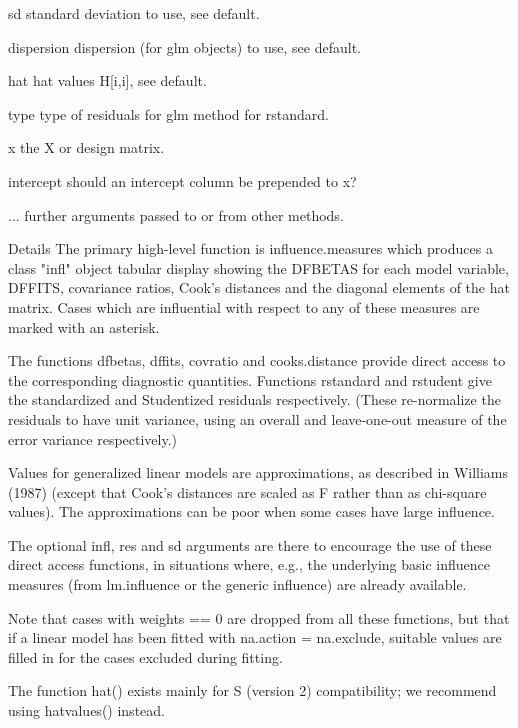 sd standard deviation to use, see default.
 
dispersion dispersion (for glm objects) to use, see default.
 
hat hat values H[i,i], see default.
 
type type of residuals for glm method for rstandard.
 
x the X or design matrix.
 
intercept should an intercept column be prepended to x?
 
... further arguments passed to or from other methods.
 

Details
The primary high-level function is influence.measures which produces a class "infl" object tabular display showing the DFBETAS for each model variable, DFFITS, covariance ratios, Cook's distances and the diagonal elements of the hat matrix. Cases which are influential with respect to any of these measures are marked with an asterisk. 

The functions dfbetas, dffits, covratio and cooks.distance provide direct access to the corresponding diagnostic quantities. Functions rstandard and rstudent give the standardized and Studentized residuals respectively. (These re-normalize the residuals to have unit variance, using an overall and leave-one-out measure of the error variance respectively.) 

Values for generalized linear models are approximations, as described in Williams (1987) (except that Cook's distances are scaled as F rather than as chi-square values). The approximations can be poor when some cases have large influence. 

The optional infl, res and sd arguments are there to encourage the use of these direct access functions, in situations where, e.g., the underlying basic influence measures (from lm.influence or the generic influence) are already available. 

Note that cases with weights == 0 are dropped from all these functions, but that if a linear model has been fitted with na.action = na.exclude, suitable values are filled in for the cases excluded during fitting. 

The function hat() exists mainly for S (version 2) compatibility; we recommend using hatvalues() instead. 

